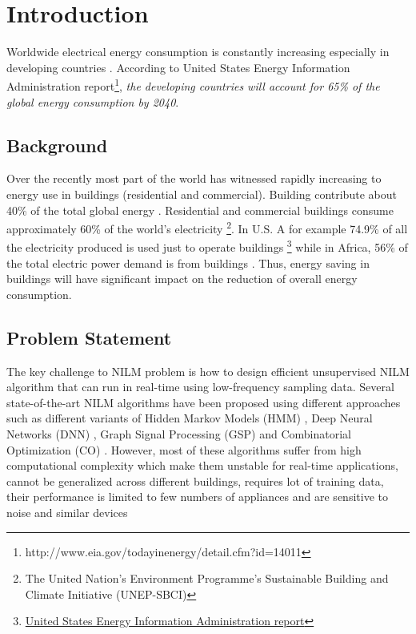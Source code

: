 \section{Introduction}
Worldwide electrical energy consumption is constantly increasing especially in developing countries \citep{Monacchi2013}. According to United States Energy Information Administration report\footnote{http://www.eia.gov/todayinenergy/detail.cfm?id=14011}, \textit{the developing countries will account for 65\% of the global energy consumption by 2040}. 

\lipsum[1]

\subsection{Background}

Over the recently most part of the world has witnessed rapidly increasing to energy use in buildings (residential and commercial). Building contribute about 40\% of the total global energy \citep{Batra2014c}. Residential and commercial buildings consume approximately 60\% of the world’s electricity \footnote{The United Nation’s Environment Programme’s Sustainable Building and Climate Initiative (UNEP-SBCI)}. In U.S. A for example 74.9\% of all the electricity produced is used just to operate buildings \footnote{\href{http://www.eia.gov/todayinenergy/detail.cfm?id=14011}{United States Energy Information Administration report}} while in Africa, 56\% of the total electric power demand is from buildings \citep{Kitio2013}. Thus, energy saving in buildings will have significant impact on the reduction of overall energy consumption.

\lipsum[1]

\subsection{Problem Statement}

The key challenge to NILM problem is how to design efficient unsupervised NILM algorithm that can run in real-time using low-frequency sampling data. Several state-of-the-art NILM algorithms have been proposed using different approaches such as different variants of Hidden Markov Models (HMM) \citep{Kim2011,Parson2012,Kolter2012,Makonin2015}, Deep Neural Networks (DNN) \citep{Badayos2015,Paulo2016a}, Graph Signal Processing (GSP) \citep{Stankovic2014,Zhao2016a} and Combinatorial Optimization (CO) \citep{ReyesLua2015,Batra2013}. However, most of these algorithms suffer from high computational complexity which make them unstable for real-time applications, cannot be generalized across different buildings, requires lot of training data, their performance is limited to few numbers of appliances and are sensitive to noise and similar devices

